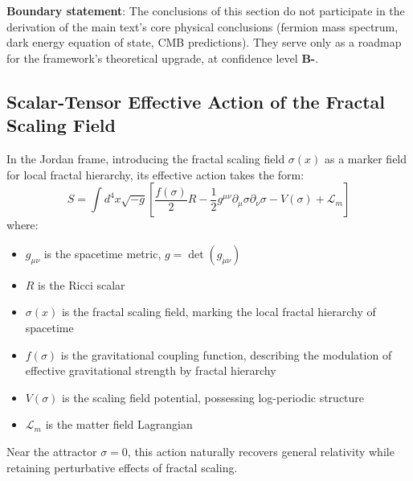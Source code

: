 \documentclass[12pt,a4paper,twocolumn]{article}
\begin{document}
\textbf{Boundary statement}: The conclusions of this section do not participate in the derivation of the main text's core physical conclusions (fermion mass spectrum, dark energy equation of state, CMB predictions). They serve only as a roadmap for the framework's theoretical upgrade, at confidence level \textbf{B-}.

\subsection{Scalar-Tensor Effective Action of the Fractal Scaling Field}
In the Jordan frame, introducing the fractal scaling field $\sigma(x)$ as a marker field for local fractal hierarchy, its effective action takes the form:
\begin{equation}
S = \int d^4x \sqrt{-g} \left[ \frac{f(\sigma)}{2} R - \frac{1}{2} g^{\mu\nu} \partial_\mu\sigma \partial_\nu\sigma - V(\sigma) + \mathcal{L}_m \right]
\label{eq:scalar_tensor_action}
\end{equation}
where:
\begin{itemize}
\item $g_{\mu\nu}$ is the spacetime metric, $g = \det(g_{\mu\nu})$
\item $R$ is the Ricci scalar
\item $\sigma(x)$ is the fractal scaling field, marking the local fractal hierarchy of spacetime
\item $f(\sigma)$ is the gravitational coupling function, describing the modulation of effective gravitational strength by fractal hierarchy
\item $V(\sigma)$ is the scaling field potential, possessing log-periodic structure
\item $\mathcal{L}_m$ is the matter field Lagrangian
\end{itemize}
Near the attractor $\sigma=0$, this action naturally recovers general relativity while retaining perturbative effects of fractal scaling.
\end{document}
